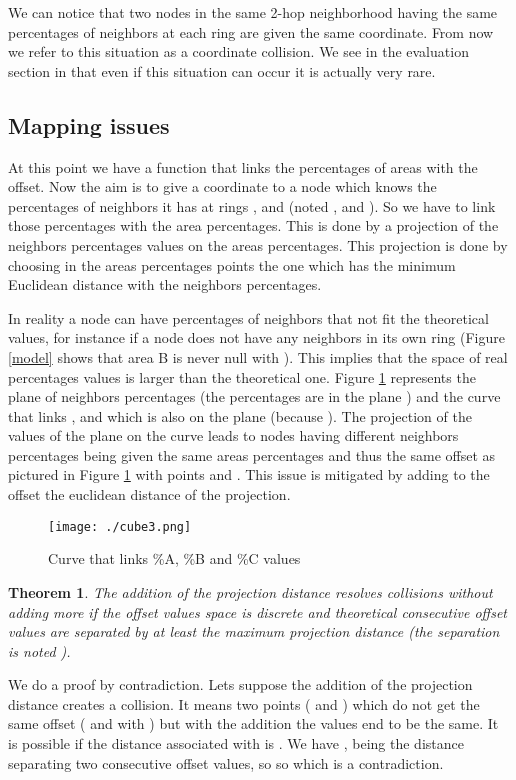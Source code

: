 \documentclass[a4paper]{article}
\newtheorem{theorem}{Theorem}[section]
\newenvironment{proof}[1][Proof]{\begin{trivlist}
\item[\hskip \labelsep {\bfseries #1}]}{\end{trivlist}}
\begin{document}
We can notice that two nodes in the same 2-hop neighborhood having the same percentages of neighbors at each ring are given the same coordinate. From now we refer to this situation as a coordinate collision. We see in the evaluation section in that even if this situation can occur it is actually very rare. 

\subsection{Mapping issues}

At this point we have a function that links the percentages of areas with the offset. Now the aim is to give a coordinate to a node which knows the percentages of neighbors it has at rings ,  and  (noted ,  and ). So we have to link those percentages with the area percentages. This is done by a projection of the neighbors percentages values on the areas percentages. This projection is done by choosing in the areas percentages points the one which has the minimum Euclidean distance with the neighbors percentages.

In reality a node can have percentages of neighbors that not fit the theoretical values, for instance if a node does not have any neighbors in its own ring (Figure \ref{model} shows that area B is never null with ). This implies that the space of real percentages values is larger than the theoretical one. Figure \ref{cube} represents the plane of neighbors percentages (the percentages are in the plane ) and the curve that links ,  and  which is also on the plane (because ). The projection of the values of the plane on the curve leads to nodes having different neighbors percentages being given the same areas percentages and thus the same offset as pictured in Figure \ref{cube} with points  and . This issue is mitigated by adding to the offset the euclidean distance of the projection.


\begin{figure}[!h]
  \centering
  \texttt{[image: ./cube3.png]}
  \caption{Curve that links \%A, \%B and \%C values}
  \label{cube}
\end{figure}

\begin{theorem}
The addition of the projection distance resolves collisions without adding more if the offset values space is discrete and theoretical consecutive offset values are separated by at least the maximum projection distance (the separation is noted ). 
\end{theorem}
\begin{proof}
 We do a proof by contradiction. Lets suppose the addition of the projection distance creates a collision. It means two points ( and ) which do not get the same offset ( and  with ) but with the addition the values end to be the same. It is possible if the distance  associated with  is . We have ,  being the distance separating two consecutive offset values, so  so  which is a contradiction.
\end{proof}
\end{document}
